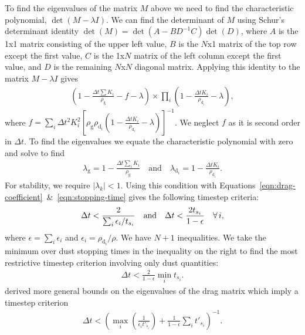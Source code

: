 \documentclass[fleqn,usenatbib]{mnras}
\newcommand{\g}{\mathrm{g}}
\newcommand{\dd}{\mathrm{d}}
\begin{document}
%
To find the eigenvalues of the matrix \(M\) above we need to find the
characteristic polynomial, \(\det(M - \lambda I)\). We can find the determinant
of \(M\) using Schur's determinant identity \(\det(M) = \det(A - B D^{-1} C)
\det(D)\), where \(A\) is the 1x1 matrix consisting of the upper left value,
\(B\) is the \(N\)x1 matrix of the top row except the first value, \(C\) is the
1x\(N\) matrix of the left column except the first value, and \(D\) is the
remaining \(N\)x\(N\) diagonal matrix. Applying this identity to the matrix \(M
- \lambda I\) gives
%
\begin{align}
   \left(1 - \frac{\Delta t \sum K_i}{\rho_{\g}} - f - \lambda\right)
   \times \prod_i \left(1 - \frac{\Delta t K_i}{\rho_{\dd_i}} - \lambda\right),
\end{align}
%
where \(f = \sum_i \Delta t^2 K_i^2 \left[\rho_{\g} \rho_{\dd_i} \left( 1 -
\frac{\Delta t K_i}{\rho_{\dd_i}} - \lambda \right) \right]^{-1}\). We neglect
\(f\) as it is second order in \(\Delta t\). To find the eigenvalues we equate
the characteristic polynomial with zero and solve to find
%
\begin{align}
   \lambda_{\g} = 1 - \frac{\Delta t \sum_i K_i}{\rho_{\g}} \quad \mathrm{and} \quad
   \lambda_{\dd_i} = 1 - \frac{\Delta t K_i}{\rho_{\dd_i}}.
\end{align}
%
For stability, we require \(|\lambda_k| < 1\). Using this condition with
Equations~\ref{eqn:drag-coefficient}~\&~\ref{eqn:stopping-time} gives the
following timestep criteria:
%
\begin{align}
   \Delta t < \frac{2}{\sum_i \epsilon_i / t_{s_i}} \quad {\rm and} \quad
   \Delta t < \frac{2 t_{s_i}}{1 - \epsilon} \quad \forall \, i,
\end{align}
%
where \(\epsilon = \sum_i \epsilon_i\) and \(\epsilon_i = \rho_{\dd_i} / \rho\).
We have \(N + 1\) inequalities. We take the minimum over dust stopping times in
the inequality on the right to find the most restrictive timestep criterion
involving only dust quantities:
%
\begin{align}
   \label{eqn:timestep-dust}
   \Delta t < \frac{2}{1 - \epsilon} \min_i t_{s_i}.
\end{align}
%
\citet{Laibe2014MNRAS.444.1940L} derived more general bounds on the eigenvalues
of the drag matrix which imply a timestep criterion
%
\begin{align}
   \Delta t < \left( \max_i \left(\frac{1}{\epsilon_i t'_{s_i}}\right)
      + \frac{1}{1 - \epsilon} \sum_i t'_{s_i} \right)^{-1}.
\end{align}
\end{document}
